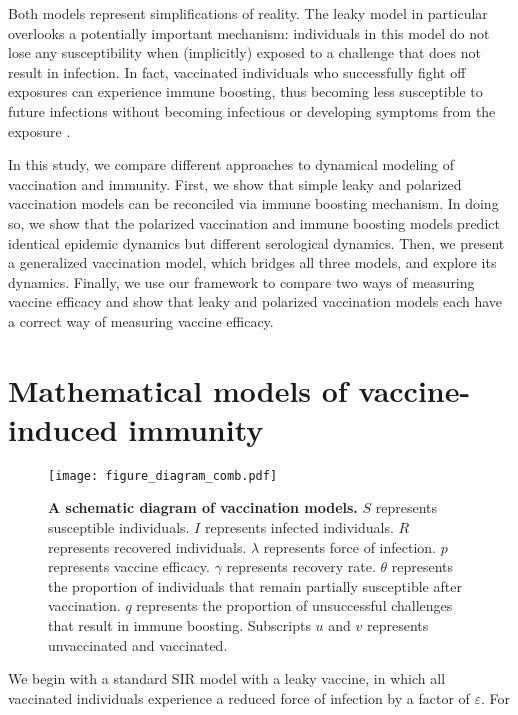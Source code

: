 \documentclass[12pt]{article}
\begin{document}
Both models represent simplifications of reality.
The leaky model in particular overlooks a potentially important mechanism: individuals in this model do not lose any susceptibility when (implicitly) exposed to a challenge that does not result in infection. 
In fact, vaccinated individuals who successfully fight off exposures can experience immune boosting, thus becoming less susceptible to future infections without becoming infectious or developing symptoms from the exposure \citep{lavine2011natural,yang2020waning}.

In this study, we compare different approaches to dynamical modeling of vaccination and immunity.
First, we show that simple leaky and polarized vaccination models can be reconciled via immune boosting mechanism.
In doing so, we show that the polarized vaccination and immune boosting models predict identical epidemic dynamics but different serological dynamics.
Then, we present a generalized vaccination model, which bridges all three models, and explore its dynamics.
Finally, we use our framework to compare two ways of measuring vaccine efficacy and show that leaky and polarized vaccination models each have a correct way of measuring vaccine efficacy.

\section*{Mathematical models of vaccine-induced immunity}

\begin{figure}[!th]
\texttt{[image: figure\_diagram\_comb.pdf]}
\caption{
\textbf{A schematic diagram of vaccination models.}
$S$ represents susceptible individuals. $I$ represents infected individuals. $R$ represents recovered individuals.
$\lambda$ represents force of infection. 
$p$ represents vaccine efficacy.
$\gamma$ represents recovery rate.
$\theta$ represents the proportion of individuals that remain partially susceptible after vaccination.
$q$ represents the proportion of unsuccessful challenges that result in immune boosting.
Subscripts $u$ and $v$ represents unvaccinated and vaccinated.
\label{fig:diagram}
}
\end{figure}

We begin with a standard SIR model with a leaky vaccine, in which all vaccinated individuals experience a reduced force of infection by a factor of $\varepsilon$.
For 
\end{document}
